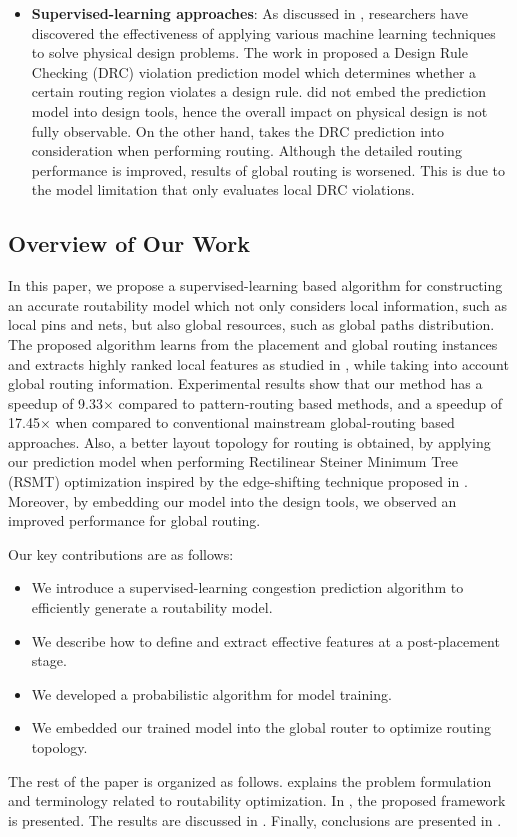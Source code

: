 \begin{itemize}
\item \textbf{Supervised-learning approaches}: As discussed in \cite{mlinphysicaldesign}, researchers have discovered the effectiveness of applying various machine learning techniques to solve physical design problems. The work in \cite{drcpredict18} proposed a Design Rule Checking (DRC) violation prediction model which determines whether a certain routing region  violates a design rule.   \cite{drcpredict18,drcDAT18} did not embed the prediction model into design tools, hence the overall impact on physical design is not fully observable. On the other hand, \cite{drcingr} takes the DRC prediction into consideration when performing routing. Although the detailed routing performance is improved, results of global routing is worsened. This is due to the model limitation that only evaluates local DRC violations.
\end{itemize}


\subsection{Overview of Our Work}
In this paper, we propose a supervised-learning based algorithm for constructing an accurate routability model which not only considers local information, such as local pins and nets, but also global resources, such as global paths distribution.
The proposed algorithm learns from the placement and global routing instances and extracts highly ranked local features as studied in \cite{parameterstudy}, while taking into account global routing information.
Experimental results show that our method has a speedup of 9.33$\times$ compared to pattern-routing based methods, and a speedup of 17.45$\times$ when compared to conventional mainstream global-routing based approaches. Also, a better layout topology for routing is obtained, by applying our prediction model when performing Rectilinear Steiner Minimum Tree (RSMT) optimization inspired by the edge-shifting technique proposed in \cite{fastroute}.
Moreover, by embedding our model into the design tools, we observed an improved performance for global routing.


Our key contributions are as follows:
\begin{itemize}
\item We introduce a supervised-learning congestion prediction algorithm to efficiently generate a routability model.
\item We describe how to define and extract effective features at a post-placement stage.
\item We developed a probabilistic algorithm for model training.
\item We embedded our trained model into the global router to optimize routing topology.
\end{itemize}

The rest of the paper is organized as follows.
 explains the problem formulation and terminology related to routability optimization.
In , the proposed framework is presented.
The results are discussed in . Finally, conclusions are presented in .

